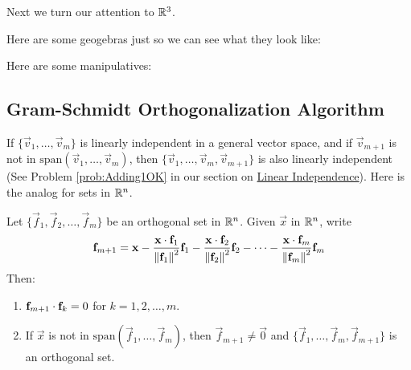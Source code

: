 \documentclass{ximera}
\begin{document}
Next we turn our attention to $\mathbb{R}^3$.

Here are some geogebras just so we can see what they look like:
\begin{exploration}
Here are some manipulatives:
\begin{center}
\end{center}

\begin{center}
\end{center}

\begin{center}
\end{center}
\end{exploration}




\subsection*{Gram-Schmidt Orthogonalization Algorithm}
If $\{\vec{v}_{1}, \dots , \vec{v}_{m}\}$ is linearly independent in a general vector space, and if $\vec{v}_{m+1}$ is not in $\mbox{span}\left(\vec{v}_{1}, \dots , \vec{v}_{m}\right)$, then $\{\vec{v}_{1}, \dots , \vec{v}_{m}, \vec{v}_{m+1}\}$ is also linearly independent (See Problem \ref{prob:Adding1OK} in our section on \href{https://ximera.osu.edu/oerlinalg/LinearAlgebra/VEC-0100/main}{Linear Independence}). Here is the analog for  sets in $\mathbb{R}^n$.


\begin{lemma}\label{023597}
Let $\{\vec{f}_{1}, \vec{f}_{2}, \dots , \vec{f}_{m}\}$ be an orthogonal set in $\mathbb{R}^n$. Given $\vec{x}$ in $\mathbb{R}^n$, write
\begin{equation*}
\mathbf{f}_{m+1} = \mathbf{x} - \frac{\mathbf{x} \cdot \mathbf{f}_{1}}{\left\lVert\mathbf{f}_{1}\right\rVert^2}\mathbf{f}_{1} - \frac{\mathbf{x} \cdot \mathbf{f}_{2}}{\left\lVert\mathbf{f}_{2}\right\rVert^2}\mathbf{f}_{2} - \dots - \frac{\mathbf{x} \cdot \mathbf{f}_{m}}{\left\lVert\mathbf{f}_{m}\right\rVert^2}\mathbf{f}_{m}
\end{equation*}
Then:

\begin{enumerate}
\item\label{023597a} $\mathbf{f}_{m+1} \cdot \mathbf{f}_{k} = 0$ for $k = 1, 2, \dots , m$.

\item\label{023597b} If $\vec{x}$ is not in $\mbox{span}\left(\vec{f}_{1}, \dots , \vec{f}_{m}\right)$, then $\vec{f}_{m+1} \neq \vec{0}$ and $\{\vec{f}_{1}, \dots , \vec{f}_{m}, \vec{f}_{m+1}\}$ is an orthogonal set.

\end{enumerate}
\end{lemma}
\end{document}
